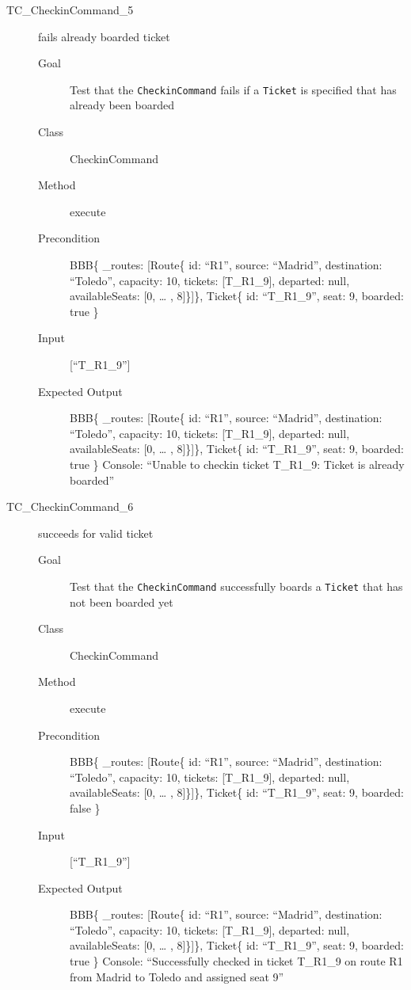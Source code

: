 \documentclass[11pt]{article}
\begin{document}
\begin{description}
\item[{TC\_CheckinCommand\_5}] fails already boarded ticket
\begin{description}
\item[{Goal}] Test that the \texttt{CheckinCommand} fails if a \texttt{Ticket} is specified that has already been boarded
\item[{Class}] CheckinCommand
\item[{Method}] execute
\item[{Precondition}] BBB\{ \_routes: [Route\{ id: “R1”, source: “Madrid”, destination: “Toledo”, capacity: 10,  tickets: [T\_R1\_9], departed: null, availableSeats: [0, … , 8]\}]\}, Ticket\{ id: “T\_R1\_9”, seat: 9, boarded: true \}
\item[{Input}] [“T\_R1\_9”]
\item[{Expected Output}] BBB\{ \_routes: [Route\{ id: “R1”, source: “Madrid”, destination: “Toledo”, capacity: 10,  tickets: [T\_R1\_9], departed: null, availableSeats: [0, … , 8]\}]\}, Ticket\{ id: “T\_R1\_9”, seat: 9, boarded: true \}
Console: “Unable to checkin ticket T\_R1\_9: Ticket is already boarded”
\end{description}
\end{description}


\begin{description}
\item[{TC\_CheckinCommand\_6}] succeeds for valid ticket
\begin{description}
\item[{Goal}] Test that the \texttt{CheckinCommand} successfully boards a \texttt{Ticket} that has not been boarded yet
\item[{Class}] CheckinCommand
\item[{Method}] execute
\item[{Precondition}] BBB\{ \_routes: [Route\{ id: “R1”, source: “Madrid”, destination: “Toledo”, capacity: 10,  tickets: [T\_R1\_9], departed: null, availableSeats: [0, … , 8]\}]\}, Ticket\{ id: “T\_R1\_9”, seat: 9, boarded: false \}
\item[{Input}] [“T\_R1\_9”]
\item[{Expected Output}] BBB\{ \_routes: [Route\{ id: “R1”, source: “Madrid”, destination: “Toledo”, capacity: 10,  tickets: [T\_R1\_9], departed: null, availableSeats: [0, … , 8]\}]\}, Ticket\{ id: “T\_R1\_9”, seat: 9, boarded: true \}
Console: “Successfully checked in ticket T\_R1\_9 on route R1 from Madrid to Toledo and assigned seat 9”
\end{description}
\end{description}
\end{document}
